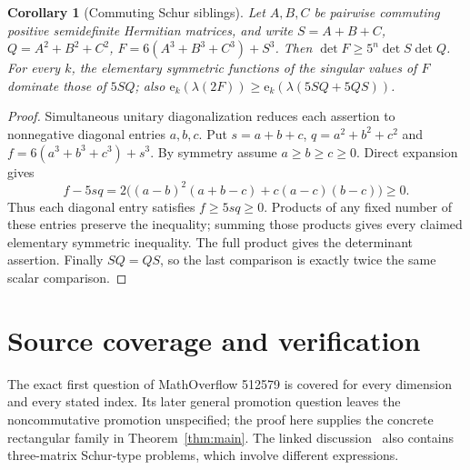 \documentclass[11pt]{article}
\newtheorem{corollary}[theorem]{Corollary}
\newcommand{\ee}{\mathrm e}
\begin{document}
\begin{corollary}[Commuting Schur siblings]\label{cor:schur}
Let $A,B,C$ be pairwise commuting positive semidefinite Hermitian matrices,
and write $S=A+B+C$, $Q=A^2+B^2+C^2$, $F=6(A^3+B^3+C^3)+S^3$.
Then $\det F\geq5^n\det S\det Q$.
For every $k$, the elementary symmetric functions of the singular values
of $F$ dominate those of $5SQ$; also
$\ee_k(\lambda(2F))\geq\ee_k(\lambda(5SQ+5QS))$.
\end{corollary}
\begin{proof}
Simultaneous unitary diagonalization reduces each assertion to nonnegative
diagonal entries $a,b,c$. Put $s=a+b+c$, $q=a^2+b^2+c^2$ and
$f=6(a^3+b^3+c^3)+s^3$.
By symmetry assume $a\geq b\geq c\geq0$. Direct expansion gives
\[
 f-5sq=2\bigl((a-b)^2(a+b-c)+c(a-c)(b-c)\bigr)\geq0.
\]
Thus each diagonal entry satisfies $f\geq5sq\geq0$.
Products of any fixed number of these entries preserve the inequality;
summing those products gives every claimed elementary symmetric inequality.
The full product gives the determinant assertion. Finally $SQ=QS$, so the
last comparison is exactly twice the same scalar comparison.
\end{proof}

\section{Source coverage and verification}
The exact first question of MathOverflow 512579 is covered for every dimension
and every stated index. Its later general promotion question leaves the
noncommutative promotion unspecified; the proof here supplies the concrete
rectangular family in Theorem~\ref{thm:main}.
The linked discussion~\cite{malkoun-answer,krokop,cubesteak} also contains
three-matrix Schur-type problems, which involve different expressions.
\end{document}
